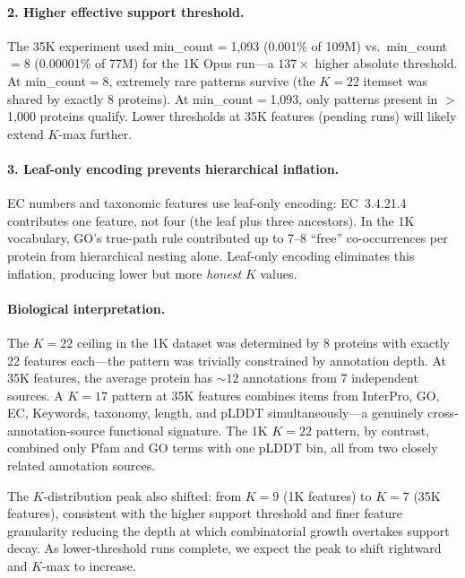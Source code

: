 \paragraph{2. Higher effective support threshold.}
The 35K experiment used min\_count$=$1,093 (0.001\% of 109M) vs.\
min\_count$=$8 (0.00001\% of 77M) for the 1K Opus run---a $137\times$ higher
absolute threshold. At min\_count$=$8, extremely rare patterns survive
(the $K{=}22$ itemset was shared by exactly 8 proteins). At
min\_count$=$1,093, only patterns present in $>$1,000 proteins qualify.
Lower thresholds at 35K features (pending runs) will likely extend $K$-max
further.

\paragraph{3. Leaf-only encoding prevents hierarchical inflation.}
EC numbers and taxonomic features use leaf-only encoding:
EC~3.4.21.4 contributes one feature, not four (the leaf plus three ancestors).
In the 1K vocabulary, GO's true-path rule contributed up to 7--8
``free'' co-occurrences per protein from hierarchical nesting alone. Leaf-only
encoding eliminates this inflation, producing lower but more \emph{honest}
$K$ values.

\paragraph{Biological interpretation.}
The $K{=}22$ ceiling in the 1K dataset was determined by 8 proteins with
exactly 22 features each---the pattern was trivially constrained by annotation
depth. At 35K features, the average protein has ${\sim}12$ annotations from 7
independent sources. A $K{=}17$ pattern at 35K features combines items from
InterPro, GO, EC, Keywords, taxonomy, length, and pLDDT simultaneously---a
genuinely cross-annotation-source functional signature. The 1K $K{=}22$
pattern, by contrast, combined only Pfam and GO terms with one pLDDT bin,
all from two closely related annotation sources.

The $K$-distribution peak also shifted: from $K{=}9$ (1K features) to $K{=}7$
(35K features), consistent with the higher support threshold and finer feature
granularity reducing the depth at which combinatorial growth overtakes support
decay. As lower-threshold runs complete, we expect the peak to shift rightward
and $K$-max to increase.


%

